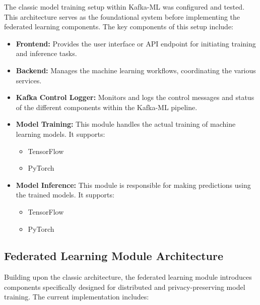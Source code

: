 The classic model training setup within Kafka-ML was configured and tested. This architecture serves as the foundational system before implementing the federated learning components. The key components of this setup include:

\begin{itemize}
    \item \textbf{Frontend:} Provides the user interface or API endpoint for initiating training and inference tasks.
    \item \textbf{Backend:} Manages the machine learning workflows, coordinating the various services.
    \item \textbf{Kafka Control Logger:} Monitors and logs the control messages and status of the different components within the Kafka-ML pipeline.
    \item \textbf{Model Training:} This module handles the actual training of machine learning models. It supports:
    \begin{itemize}
        \item TensorFlow
        \item PyTorch
    \end{itemize}
    \item \textbf{Model Inference:} This module is responsible for making predictions using the trained models. It supports:
    \begin{itemize}
        \item TensorFlow
        \item PyTorch
    \end{itemize}
\end{itemize}

\subsection{Federated Learning Module Architecture}
\label{subsec:federated_learning_module}

Building upon the classic architecture, the federated learning module introduces components specifically designed for distributed and privacy-preserving model training. The current implementation includes:

